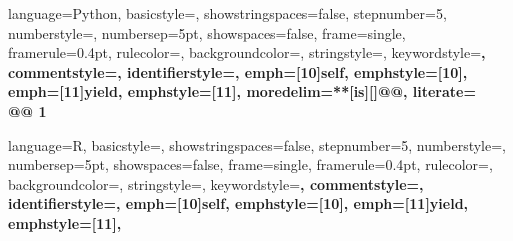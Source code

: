 \makeatother

\newcommand\ProcessThreeDashes{\llap{\color{cyan}\mdseries-{-}-}}


\makeatletter
\newcommand\applyCurrentFontsize
{%
	\let\f@sizeS@ved\f@size%
	\let\f@baselineskipS@ved\f@baselineskip%
	\let\basicstyleS@ved\lst@basicstyle%
	\renewcommand\lst@basicstyle%
	{%
		\basicstyleS@ved%
		\fontsize{\f@sizeS@ved}{\f@baselineskipS@ved}%
		\selectfont%
	}%
}
\makeatother

\newcommand{\altverb}[2][{}]{\colorbox{plightgrey}{\applyCurrentFontsize \lstinline[language={#1}]{#2}}}



\lstset{showspaces=false,
basicstyle=\small,
showstringspaces=false}


{
  language=Python,
  basicstyle=\small,
  showstringspaces=false,
  stepnumber=5,
  numberstyle=\tiny,
  numbersep=5pt,
  showspaces=false,
  frame=single,
  framerule=0.4pt,
  rulecolor=\color{pgrey},
  backgroundcolor=\color{white},
  stringstyle=\color{BrickRed},
  keywordstyle=\color{BlueViolet}\bfseries,
  commentstyle=\color{PineGreen}\bfseries,
  identifierstyle={},
  emph={[10]self}, emphstyle={[10]\color{pblue}},
  emph={[11]yield}, emphstyle={[11]\color{pblue}},
  moredelim=**[is][\bfseries\color{red}]{@}{@},
  literate={\\@}{{\makeatletter @ \makeatother}}1
}

{
  language=R,
  basicstyle=\small,
  showstringspaces=false,
  stepnumber=5,
  numberstyle=\tiny,
  numbersep=5pt,
  showspaces=false,
  frame=single,
  framerule=0.4pt,
  rulecolor=\color{pgrey},
  backgroundcolor=\color{white},
  stringstyle=\color{BrickRed},
  keywordstyle=\color{BlueViolet}\bfseries,
  commentstyle=\color{PineGreen}\bfseries,
  identifierstyle={},
  emph={[10]self}, emphstyle={[10]\color{pblue}},
  emph={[11]yield}, emphstyle={[11]\color{pblue}},
}

